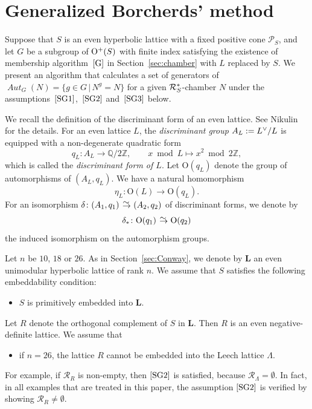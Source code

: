 \documentclass{amsart}
\theoremstyle{plain}
\theoremstyle{definition}
\theoremstyle{remark}
\numberwithin{equation}{section}
\numberwithin{table}{section}
\numberwithin{figure}{section}
\newcommand{\Q}{\mathord{\mathbb  Q}}
\newcommand{\Z}{\mathord{\mathbb Z}}
\newcommand{\PPP}{\mathord{\mathcal P}}
\newcommand{\RRR}{\mathord{\mathcal R}}
\newcommand{\isom}{\mathbin{\,\raise -.6pt\rlap{$\to$}\raise 3.5pt \hbox{\hskip .3pt$\mathord{\sim}$}\;}}
\newcommand{\shortset}[2]{\{ {#1} \,|\, {#2}   \}}
\newcommand{\dual}{\sp{\vee}}
\newcommand{\OG}{\mathord{\mathrm {O}}}
\renewcommand{\L}{\mathord{\mathbf{L}}}
\newcommand{\aut}{\operatorname{\mathit {Aut}}\nolimits}
\newcommand{\Roots}{\RRR}
\newcommand{\sphyp}{\sp*}
\newcommand{\discgr}[1]{A_{#1}}
\newcommand{\Nc}{N}
\newcommand{\propVG}{\mathord{\rm [G]}}
\newcommand{\assumpone}{\mathord{\rm [SG1]}}
\newcommand{\assumptwo}{\mathord{\rm [SG2]}}
\newcommand{\assumpthree}{\mathord{\rm [SG3]}}
\begin{document}
\section{Generalized Borcherds' method}\label{sec:Borcherds}
%
%
Suppose that $S$ is an even hyperbolic lattice
with a fixed positive cone $\PPP_S$,
and let $G$ be  a subgroup of $\OG\sp+(S)$ with finite index
satisfying the existence of membership algorithm~$\propVG$ in Section~\ref{sec:chamber} with $L$ replaced by $S$.
We present an algorithm that calculates a set of generators of
$\aut_G(\Nc)=\shortset{g\in G}{\Nc^g=\Nc}$ for a given $\RRR_S\sphyp$-chamber $\Nc$
under the assumptions~$\assumpone$,~$\assumptwo$ and~$\assumpthree$ below.
\par
We recall the definition of the discriminant form of an even lattice.
See Nikulin~\cite{MR525944} for the details.
For an even lattice $L$,
the \emph{discriminant group} $\discgr{L}:=L\dual/L$ is  equipped with a non-degenerate quadratic form
$$
q_L \colon \discgr{L}\to \Q/2\Z, \qquad x \bmod L\mapsto x^2 \bmod 2\Z,
$$
 which is called the \emph{discriminant form of $L$}.
 Let $\OG(q_L)$ denote the group of automorphisms of $(\discgr{L}, q_L)$.
We have a natural homomorphism
$$
\eta_L \colon \OG(L)\to \OG(q_L).
$$
For an isomorphism $\delta\colon (A_1, q_1)\isom (A_2, q_2)$
of discriminant forms,
we denote by
$$
\delta_*\colon \OG(q_1)\isom \OG(q_2)
$$
the induced isomorphism on the automorphism groups.
\par
Let $n$ be $10$, $18$ or $26$.
As in Section~\ref{sec:Conway}, 
we denote by  $\L$  an even unimodular hyperbolic lattice of rank $n$.
We assume that $S$ satisfies the following embeddability  condition:
%
\begin{itemize}
\item[$\assumpone$]\quad 
\textrm{$S$ is primitively embedded into $\L$.}
\end{itemize}
%
Let $R$ denote the orthogonal complement of $S$ in ${\L}$.
Then $R$ is an even negative-definite lattice.
We assume that
%
\begin{itemize}
\item[$\assumptwo$]
\quad if $n=26$, the lattice $R$ cannot be embedded into the Leech lattice $\Lambda$.
\end{itemize}
%
For example, if $\Roots_R$ is non-empty, then $\assumptwo$ is satisfied,
because $\Roots_{\Lambda}=\emptyset$.
In fact,
in all examples that are treated in this paper, 
the assumption $\assumptwo$ is verified  by showing $\Roots_R\ne \emptyset$.
\par
\end{document}
